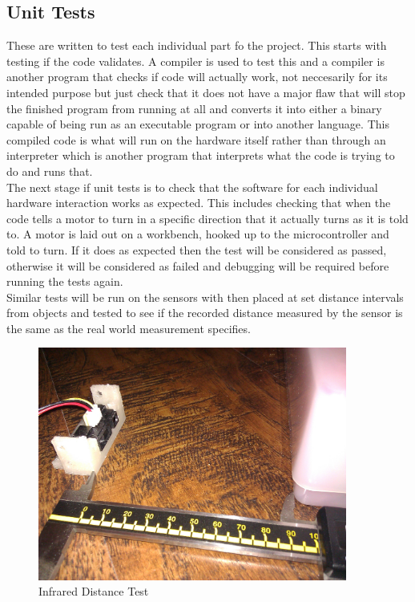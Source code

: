\subsection{Unit Tests}
These are written to test each individual part fo the project.  This starts with testing if the code validates.  A compiler is used to test this and a compiler is another program that checks if code will actually work, not neccesarily for its intended purpose but just check that it does not have a major flaw that will stop the finished program from running at all and converts it into either a binary capable of being run as an executable program or into another language.  This compiled code is what will run on the hardware itself rather than through an interpreter which is another program that interprets what the code is trying to do and runs that.
\\The next stage if unit tests is to check that the software for each individual hardware interaction works as expected.  This includes checking that when the code tells a motor to turn in a specific direction that it actually turns as it is told to.  A motor is laid out on a workbench, hooked up to the microcontroller and told to turn.  If it does as expected then the test will be considered as passed, otherwise it will be considered as failed and debugging will be required before running the tests again.
\\Similar tests will be run on the sensors with then placed at set distance intervals from objects and tested to see if the recorded distance measured by the sensor is the same as the real world measurement specifies.
\begin{figure}[h]
\centering
        \includegraphics[width=4.0in] {Images/ir-measure-2.jpg}
        \caption{Infrared Distance Test}
        \label{Infrared Distance Test}
\end{figure}
